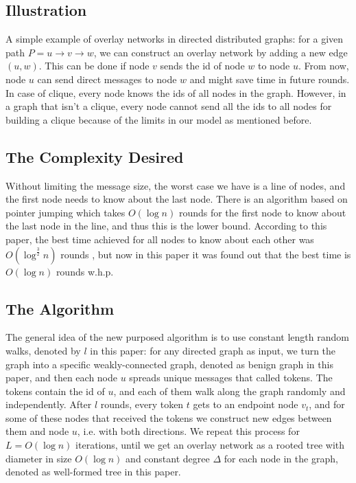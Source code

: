 \documentclass[11pt]{article}
\begin{document}
\subsection{Illustration}
A simple example of overlay networks in directed distributed graphs: for a given path $P=u\rightarrow v \rightarrow w$, we can construct an overlay network by adding a new edge $(u,w)$. This can be done if node $v$ sends the id of node $w$ to node $u$. From now, node $u$ can send direct messages to node $w$ and might save time in future rounds. In case of clique, every node knows the ids of all nodes in the graph. However, in a graph that isn't a clique, every node cannot send all the ids to all nodes for building a clique because of the limits in our model as mentioned before.

\subsection{The Complexity Desired}
Without limiting the message size, the worst case we have is a line of nodes, and the first node needs to know about the last node. There is an algorithm based on pointer jumping which takes $O(\log{n})$ rounds for the first node to know about the last node in the line, and thus this is the lower bound. According to this paper, the best time achieved for all nodes to know about each other was $O(\log^{\frac{3}{2}}n)$ rounds \cite{ref1}, but now in this paper it was found out that the best time is $O(\log{n})$ rounds w.h.p.

\subsection{The Algorithm}
The general idea of the new purposed algorithm is to use constant length random walks, denoted by $l$ in this paper: for any directed graph as input, we turn the graph into a specific weakly-connected graph, denoted as benign graph in this paper, and then each node $u$ spreads unique messages that called tokens. The tokens contain the id of $u$, and each of them walk along the graph randomly and independently. After $l$ rounds, every token $t$ gets to an endpoint node $v_{t}$, and for some of these nodes that received the tokens we construct new edges between them and node $u$, i.e. with both directions. We repeat this process for $L=O(\log{n})$ iterations, until we get an overlay network as a rooted tree with diameter in size $O(\log{n})$ and constant degree $\Delta$ for each node in the graph, denoted as well-formed tree in this paper.
\end{document}
